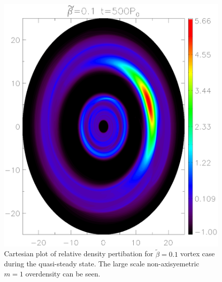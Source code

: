 \begin{figure}
  \includegraphics[width=\linewidth,height=\linewidth]{figures/vortex2D}
  \caption{Cartesian plot of relative density pertibation for
    $\tilde\beta=0.1$ vortex case during the quasi-steady state. The
    large scale non-axisyemetric $m=1$ overdensity can be
    seen. \label{Vortex2D}} 
\end{figure}






